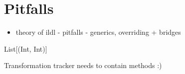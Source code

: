 \section{Pitfalls}
\label{sec:pitfalls}

\begin{itemize}
  \item theory of ildl - pitfalls - generics, overriding + bridges
\end{itemize}


\begin{lstlisting-nobreak}
List[(Int, Int)]
\end{lstlisting-nobreak}



Transformation tracker needs to contain methods :)